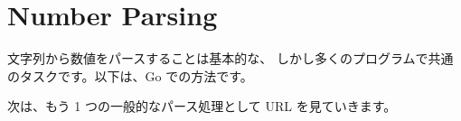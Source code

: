 \section{Number Parsing}

文字列から数値をパースすることは基本的な、 しかし多くのプログラムで共通のタスクです。以下は、Go での方法です。




次は、もう 1 つの一般的なパース処理として URL を見ていきます。